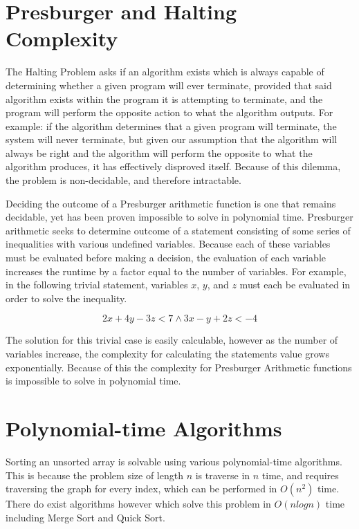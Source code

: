 \documentclass{article}
\renewcommand{\_}{\ifincsname_\else\legacyunderscore\fi}
\begin{document}
\newpage
\section{Presburger and Halting Complexity}

The Halting Problem asks if an algorithm exists which is always capable of determining whether a given program will ever terminate, provided that said algorithm exists within the program it is attempting to terminate, and the program will perform the opposite action to what the algorithm outputs. For example: if the algorithm determines that a given program will terminate, the system will never terminate, but given our assumption that the algorithm will always be right and the algorithm will perform the opposite to what the algorithm produces, it has effectively disproved itself. Because of this dilemma, the problem is non-decidable, and therefore intractable.

Deciding the outcome of a Presburger arithmetic function is one that remains decidable, yet has been proven impossible to solve in polynomial time. Presburger arithmetic seeks to determine outcome of a statement consisting of some series of inequalities with various undefined variables. Because each of these variables must be evaluated before making a decision, the evaluation of each variable increases the runtime by a factor equal to the number of variables. For example, in the following trivial statement, variables $x$, $y$, and $z$ must each be evaluated in order to solve the inequality.

\begin{equation}
    2x+4y-3z < 7 \wedge 3x-y+2z < -4
\end{equation}

The solution for this trivial case is easily calculable, however as the number of variables increase, the complexity for calculating the statements value grows exponentially. Because of this the complexity for Presburger Arithmetic functions is impossible to solve in polynomial time.

\section{Polynomial-time Algorithms}

Sorting an unsorted array is solvable using various polynomial-time algorithms. This is because the problem size of length $n$ is traverse in $n$ time, and requires traversing the graph for every index, which can be performed in $O(n^2)$ time. There do exist algorithms however which solve this problem in $O(n log n)$ time including Merge Sort and Quick Sort.
\end{document}
